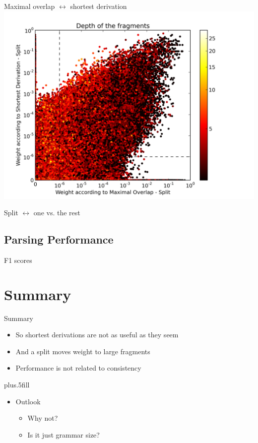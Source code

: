 \documentclass{beamer}
\begin{document}
\begin{frame}{Maximal overlap $\leftrightarrow$ shortest derivation}
\includegraphics[width=\linewidth,trim=0.5cm 0cm 2.5cm 0.5cm, clip=true]{../data/plots/0.png}
\end{frame}

\begin{frame}{Split $\leftrightarrow$ one vs. the rest}
\end{frame}

\subsection{Parsing Performance}
\begin{frame}{F1 scores}
\end{frame}


\section*{Summary}

\begin{frame}{Summary}

  \begin{itemize}
  \item
    So \alert{shortest derivations} are not as useful as they seem
  \item
    And a \alert{split} moves weight to large fragments
  \item
    \alert{Performance} is not related to \alert{consistency}
  \end{itemize}
  
  \vskip0pt plus.5fill
  \begin{itemize}
  \item
    Outlook
    \begin{itemize}
    \item
      Why not?
    \item
      Is it just grammar size?
    \end{itemize}
  \end{itemize}
\end{frame}
\end{document}
